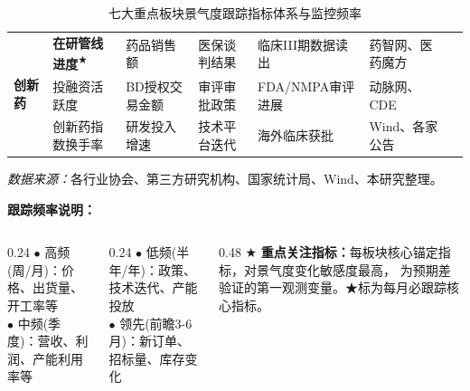 \begin{table}[htbp]
\begin{tabular}{@{}ll>{\raggedright\arraybackslash}p{2.6cm}>{\raggedright\arraybackslash}p{2.6cm}>{\raggedright\arraybackslash}p{2.6cm}>{\raggedright\arraybackslash}p{2.6cm}l@{}}
    \multirow{3}{*}{\textbf{创新药}}
      & \textbf{在研管线进度}\textsuperscript{★} & 药品销售额 & 医保谈判结果 & 临床III期数据读出 & 药智网、医药魔方 \\
      & 投融资活跃度 & BD授权交易金额 & 审评审批政策 & FDA/NMPA审评进展 & 动脉网、CDE \\
      & 创新药指数换手率 & 研发投入增速 & 技术平台迭代 & 海外临床获批 & Wind、各家公告 \\
    \bottomrule
  \end{tabular}
  \vspace{0.3em}
  \caption{七大重点板块景气度跟踪指标体系与监控频率}
  \label{tab:monitoring_metrics}
  \vspace{-0.5em}
  \footnotesize\textit{数据来源：}各行业协会、第三方研究机构、国家统计局、Wind、本研究整理。
  \vspace{0.2em}
  \begin{tcolorbox}[colback=blue!5, colframe=blue!30, boxrule=0.5pt,
      left=6pt, right=6pt, top=3pt, bottom=3pt]
    \textbf{\scriptsize 跟踪频率说明：}
    \scriptsize
    \begin{columns}[T]
      \begin{column}{0.24\textwidth}
        \textcolor{blue!80}{$\bullet$ 高频(周/月)}：价格、出货量、开工率等\\
        \textcolor{blue!80}{$\bullet$ 中频(季度)}：营收、利润、产能利用率等
      \end{column}
      \begin{column}{0.24\textwidth}
        \textcolor{blue!80}{$\bullet$ 低频(半年/年)}：政策、技术迭代、产能投放\\
        \textcolor{blue!80}{$\bullet$ 领先(前瞻3-6月)}：新订单、招标量、库存变化
      \end{column}
      \begin{column}{0.48\textwidth}
        \textcolor{red!80}{★} \textbf{重点关注指标：}每板块核心锚定指标，对景气度变化敏感度最高，
        为预期差验证的第一观测变量。\textcolor{red!80}{★}标为每月必跟踪核心指标。
      \end{column}
    \end{columns}
  \end{tcolorbox}
\end{table}
